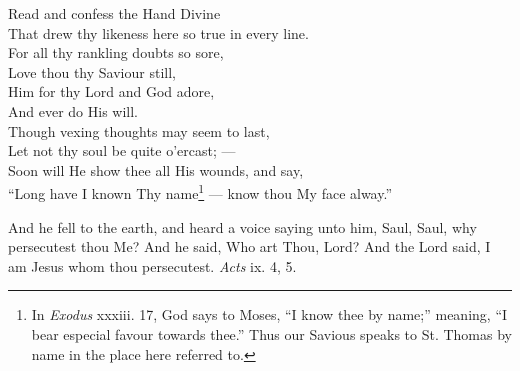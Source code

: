  Read and confess the Hand Divine \\
 That drew thy likeness here so true in every line. \\
  For all thy rankling doubts so sore, \\
 Love thou thy Saviour still, \\
 Him for thy Lord and God adore, \\
 And ever do His will. \\
 Though vexing thoughts may seem to last, \\
 Let not thy soul be quite o’ercast; — \\
 Soon will He show thee all His wounds, and say, \\
 “Long have I known Thy name\footnote{In \emph{Exodus} xxxiii. 17, God says to Moses, “I know thee by name;” meaning, “I bear especial favour towards thee.” Thus our Savious speaks to St. Thomas by name in the place here referred to.} — know thou My face alway.”\\


And he fell to the earth, and heard a voice saying unto him, Saul, Saul, why persecutest thou Me? And he said, Who art Thou, Lord? And the Lord said, I am Jesus whom thou persecutest. \emph{Acts} ix. 4, 5.

